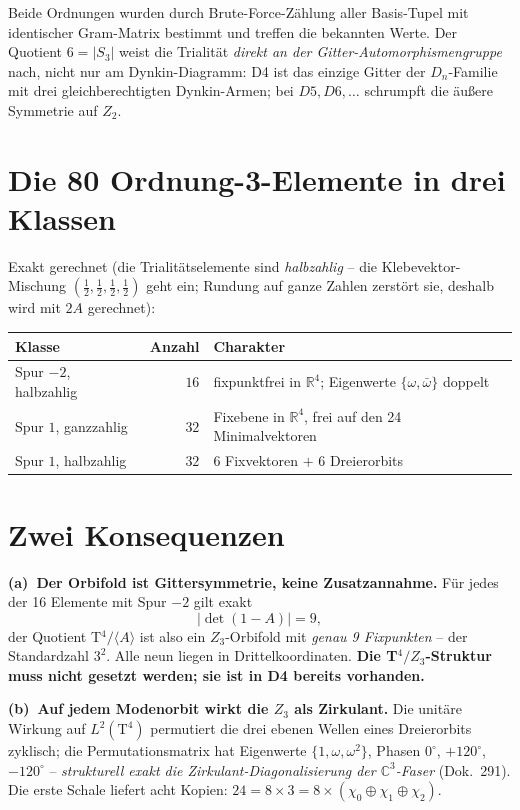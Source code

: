 \documentclass[11pt]{report}
\begin{document}
Beide Ordnungen wurden durch Brute-Force-Zählung aller
Basis-Tupel mit identischer Gram-Matrix bestimmt und treffen die
bekannten Werte. Der Quotient $6 = |S_3|$ weist die Trialität
\emph{direkt an der Gitter-Automorphismengruppe} nach, nicht nur am
Dynkin-Diagramm: D4 ist das einzige Gitter der $D_n$-Familie mit
drei gleichberechtigten Dynkin-Armen; bei $D5, D6, \dots$ schrumpft
die äußere Symmetrie auf $Z_2$.

\section{Die 80 Ordnung-3-Elemente in drei Klassen}

Exakt gerechnet (die Trialitätselemente sind \emph{halbzahlig} --
die Klebevektor-Mischung $(\frac12,\frac12,\frac12,\frac12)$ geht
ein; Rundung auf ganze Zahlen zerstört sie, deshalb wird mit $2A$
gerechnet):

\begin{center}
\begin{tabular}{lrl}
\toprule
Klasse & Anzahl & Charakter \\
\midrule
Spur $-2$, halbzahlig & $16$ & fixpunktfrei in $\mathbb{R}^4$;
  Eigenwerte $\{\omega,\bar\omega\}$ doppelt \\
Spur $1$, ganzzahlig & $32$ & Fixebene in $\mathbb{R}^4$,
  frei auf den 24 Minimalvektoren \\
Spur $1$, halbzahlig & $32$ & 6 Fixvektoren $+$ 6 Dreierorbits \\
\bottomrule
\end{tabular}
\end{center}

\section{Zwei Konsequenzen}

\textbf{(a)~Der Orbifold ist Gittersymmetrie, keine Zusatzannahme.}
Für jedes der 16 Elemente mit Spur $-2$ gilt exakt
\begin{equation}
  |\det(1-A)| = 9,
\end{equation}
der Quotient T$^4/\langle A\rangle$ ist also ein $Z_3$-Orbifold mit
\emph{genau 9 Fixpunkten} -- der Standardzahl $3^2$. Alle neun
liegen in Drittelkoordinaten. \textbf{Die T$^4/Z_3$-Struktur muss
nicht gesetzt werden; sie ist in D4 bereits vorhanden.}

\textbf{(b)~Auf jedem Modenorbit wirkt die $Z_3$ als Zirkulant.} Die
unitäre Wirkung auf $L^2(\text{T}^4)$ permutiert die drei ebenen
Wellen eines Dreierorbits zyklisch; die Permutationsmatrix hat
Eigenwerte $\{1,\omega,\omega^2\}$, Phasen $0^\circ$, $+120^\circ$,
$-120^\circ$ -- \emph{strukturell exakt die
Zirkulant-Diagonalisierung der $\mathbb{C}^3$-Faser} (Dok.~291). Die
erste Schale liefert acht Kopien: $24 = 8\times3
= 8\times(\chi_0\oplus\chi_1\oplus\chi_2)$.
\end{document}
